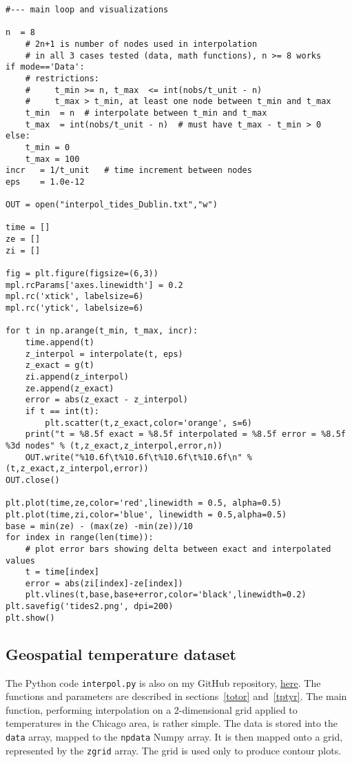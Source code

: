 \documentclass[oneside,10pt]{book}
\begin{document}
\begin{lstlisting}
#--- main loop and visualizations 

n  = 8   
    # 2n+1 is number of nodes used in interpolation 
    # in all 3 cases tested (data, math functions), n >= 8 works 
if mode=='Data':
    # restrictions: 
    #     t_min >= n, t_max  <= int(nobs/t_unit - n)
    #     t_max > t_min, at least one node between t_min and t_max
    t_min  = n  # interpolate between t_min and t_max 
    t_max  = int(nobs/t_unit - n)  # must have t_max - t_min > 0
else:
    t_min = 0
    t_max = 100
incr   = 1/t_unit   # time increment between nodes 
eps    = 1.0e-12 

OUT = open("interpol_tides_Dublin.txt","w")

time = []
ze = []
zi = []

fig = plt.figure(figsize=(6,3))
mpl.rcParams['axes.linewidth'] = 0.2
mpl.rc('xtick', labelsize=6) 
mpl.rc('ytick', labelsize=6) 

for t in np.arange(t_min, t_max, incr):  
    time.append(t)
    z_interpol = interpolate(t, eps) 
    z_exact = g(t)
    zi.append(z_interpol)
    ze.append(z_exact)
    error = abs(z_exact - z_interpol)
    if t == int(t):
        plt.scatter(t,z_exact,color='orange', s=6)
    print("t = %8.5f exact = %8.5f interpolated = %8.5f error = %8.5f %3d nodes" % (t,z_exact,z_interpol,error,n))
    OUT.write("%10.6f\t%10.6f\t%10.6f\t%10.6f\n" % (t,z_exact,z_interpol,error))
OUT.close()

plt.plot(time,ze,color='red',linewidth = 0.5, alpha=0.5) 
plt.plot(time,zi,color='blue', linewidth = 0.5,alpha=0.5)
base = min(ze) - (max(ze) -min(ze))/10
for index in range(len(time)):
    # plot error bars showing delta between exact and interpolated values
    t = time[index]
    error = abs(zi[index]-ze[index])
    plt.vlines(t,base,base+error,color='black',linewidth=0.2) 
plt.savefig('tides2.png', dpi=200)
plt.show()
\end{lstlisting}

\subsection{Geospatial temperature dataset}\label{pyif}


The Python code \texttt{interpol.py} is also on my GitHub repository, \href{https://github.com/VincentGranville/Statistical-Optimization/blob/main/interpol.py}{here}. 
The functions and parameters are described in sections~\ref{totor} and~\ref{tptyr}. The main function, performing interpolation on a 2-dimensional grid applied 
to temperatures in the Chicago area, is rather simple.  The data is stored into the \texttt{data} array, mapped to the \texttt{npdata} Numpy array. It is then mapped onto a grid,  represented 
 by the \texttt{zgrid} array. The grid is used only to produce contour plots.
\end{document}
